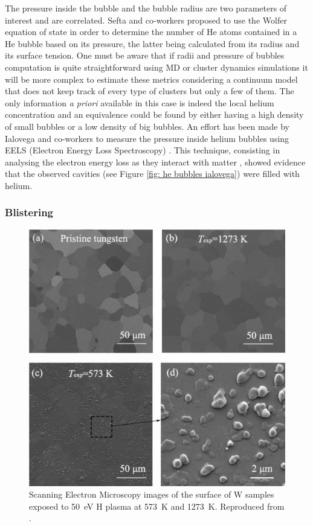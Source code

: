 The pressure inside the bubble and the bubble radius are two parameters of interest and are correlated.
Sefta and co-workers  proposed to use the Wolfer equation of state in order to determine the number of He atoms contained in a He bubble based on its pressure, the latter being calculated from its radius and its surface tension.
One must be aware that if radii and pressure of bubbles computation is quite straightforward using MD  or cluster dynamics  simulations it will be more complex to estimate these metrics considering a continuum model that does not keep track of every type of clusters but only a few of them.
The only information \textit{a priori} available in this case is indeed the local helium concentration and an equivalence could be found by either having a high density of small bubbles or a low density of big bubbles.
An effort has been made by Ialovega and co-workers to measure the pressure inside helium bubbles using EELS (Electron Energy Loss Spectroscopy) .
This technique, consisting in analysing the electron energy loss as they interact with matter , showed evidence that the observed cavities (see Figure \ref{fig: he bubbles ialovega}) were filled with helium.

\subsubsection{Blistering}

\begin{figure}
    \centering
    \includegraphics[width=\linewidth]{Figures/Chapter1/h_blisters_in_tungsten.jpg}
    \caption{Scanning Electron Microscopy images of the surface of W samples exposed to \SI{50}{eV} H plasma at \SI{573}{K} and \SI{1273}{K}. Reproduced from \cite{chen_irradiation_2019}.}
\end{figure}

